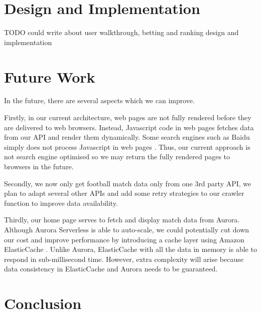 \documentclass[conference]{IEEEtran}
\begin{document}
\section{Design and Implementation}
TODO could write about user walkthrough, betting and ranking design and implementation

\section{Future Work}
In the future, there are several aspects which we can improve.

Firstly, in our current architecture, web pages are not fully rendered before they are delivered to web browsers. Instead, Javascript code in web pages fetches data from our API and render them dynamically. Some search engines such as Baidu simply does not process Javascript in web pages \cite{b17}. Thus, our current approach is not search engine optimised so we may return the fully rendered pages to browsers in the future.

Secondly, we now only get football match data only from one 3rd party API, we plan to adapt several other APIs and add some retry strategies to our crawler function to improve data availability.

Thirdly, our home page serves to fetch and display match data from Aurora. Although Aurora Serverless is able to auto-scale, we could potentially cut down our cost and improve performance by introducing a cache layer using Amazon ElasticCache \cite{b18}. Unlike Aurora, ElasticCache with all the data in memory is able to respond in sub-millisecond time. However, extra complexity will arise because data consistency in ElasticCache and Aurora needs to be guaranteed.

\section{Conclusion}
\end{document}

